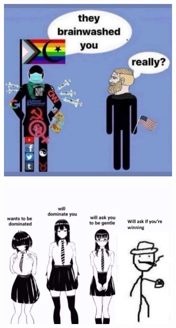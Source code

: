 \documentclass[a4paper]{article}
\begin{document}
\begin{figure}[htbp]
\centering
\includegraphics[width=0.8\textwidth]{meme-brainwashed.jpg}

\label{fig:meme-brainwashed}
\end{figure}

\begin{figure}[htbp]
\centering
\includegraphics[width=0.8\textwidth]{meme-are-ya-winning.jpg}

\label{fig:meme-are-ya-winning}
\end{figure}
\end{document}
